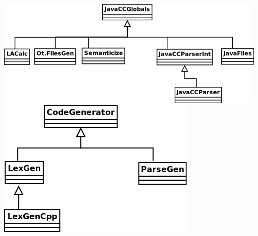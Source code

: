 \documentclass{article}
\begin{document}
\begin{center}
\includegraphics[scale=0.35]{javaCCGlobals.png}   \includegraphics[scale=0.35]{CodeGenerator.png}
\end{center}
\end{document}
